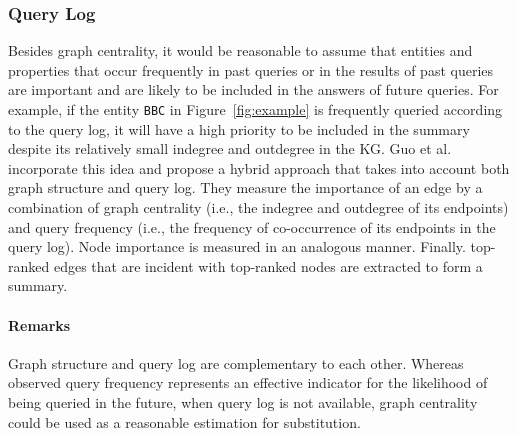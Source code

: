 \subsubsection{Query Log}
Besides graph centrality, it would be reasonable to assume that entities and properties that occur frequently in past queries or in the results of past queries are important and are likely to be included in the answers of future queries. For example, if the entity \texttt{BBC} in Figure~\ref{fig:example} is frequently queried according to the query log, it will have a high priority to be included in the summary despite its relatively small indegree and outdegree in the KG. Guo et al.~ incorporate this idea and propose a hybrid approach that takes into account both graph structure and query log. They measure the importance of an edge by a combination of graph centrality (i.e., the indegree and outdegree of its endpoints) and query frequency (i.e., the frequency of co-occurrence of its endpoints in the query log). Node importance is measured in an analogous manner.
Finally. top-ranked edges that are incident with top-ranked nodes are extracted to form a summary.

\paragraph{Remarks}
Graph structure and query log are complementary to each other. Whereas observed query frequency represents an effective indicator for the likelihood of being queried in the future, when query log is not available, graph centrality could be used as a reasonable estimation for substitution.